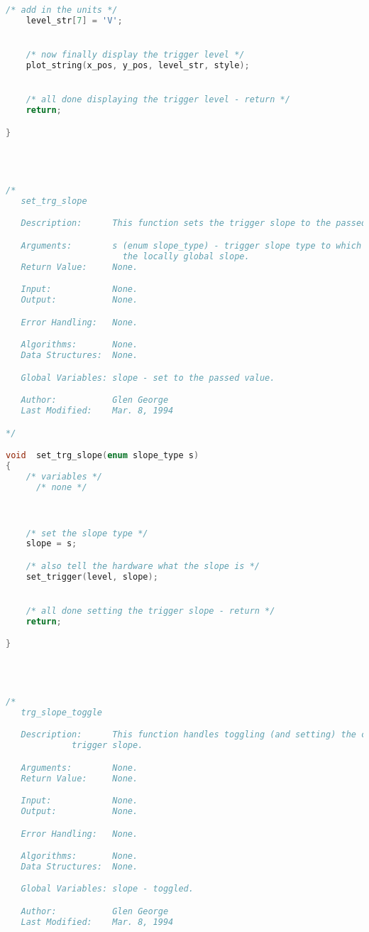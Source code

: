 \begin{lstlisting}[language=C]
    /* add in the units */
    level_str[7] = 'V';


    /* now finally display the trigger level */
    plot_string(x_pos, y_pos, level_str, style);


    /* all done displaying the trigger level - return */
    return;

}




/*
   set_trg_slope

   Description:      This function sets the trigger slope to the passed value.

   Arguments:        s (enum slope_type) - trigger slope type to which to set
   					   the locally global slope.
   Return Value:     None.

   Input:            None.
   Output:           None.

   Error Handling:   None.

   Algorithms:       None.
   Data Structures:  None.

   Global Variables: slope - set to the passed value.

   Author:           Glen George
   Last Modified:    Mar. 8, 1994

*/

void  set_trg_slope(enum slope_type s)
{
    /* variables */
      /* none */



    /* set the slope type */
    slope = s;

    /* also tell the hardware what the slope is */
    set_trigger(level, slope);


    /* all done setting the trigger slope - return */
    return;

}




/*
   trg_slope_toggle

   Description:      This function handles toggling (and setting) the current
   		     trigger slope.

   Arguments:        None.
   Return Value:     None.

   Input:            None.
   Output:           None.

   Error Handling:   None.

   Algorithms:       None.
   Data Structures:  None.

   Global Variables: slope - toggled.

   Author:           Glen George
   Last Modified:    Mar. 8, 1994


\end{lstlisting}
